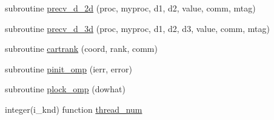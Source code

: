 \begin{DoxyCompactItemize}
\item 
subroutine \hyperlink{classplib__module_ac4722c07063b81f7b260132f16f5b17f}{precv\-\_\-d\-\_\-2d} (proc, myproc, d1, d2, value, comm, mtag)
\item 
subroutine \hyperlink{classplib__module_a4bb9d60a8dee39c7d1df606cb1ec48d1}{precv\-\_\-d\-\_\-3d} (proc, myproc, d1, d2, d3, value, comm, mtag)
\item 
subroutine \hyperlink{classplib__module_a31e3a1f18b78ea21eb4b76edcfc5352b}{cartrank} (coord, rank, comm)
\item 
subroutine \hyperlink{classplib__module_a5ad7e8ca3705ac070d1c9f1e63632153}{pinit\-\_\-omp} (ierr, error)
\item 
subroutine \hyperlink{classplib__module_af6742553d9df98f688231b8cd62cf190}{plock\-\_\-omp} (dowhat)
\item 
integer(i\-\_\-knd) function \hyperlink{classplib__module_ad50e539b9812f439eb644c69606a2bca}{thread\-\_\-num}
\end{DoxyCompactItemize}
